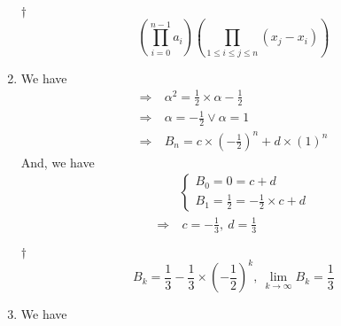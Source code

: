 \documentclass[a4paper,12pt]{article}
\begin{document}
\begin{enumerate}
    \begin{answer}{$\dag$}\begin{equation}
            (\displaystyle\prod_{i = 0}^{n - 1}a_i)(\displaystyle\prod_{1 \le i \le j \le n}(x_j - x_i))
        \end{equation} 
    \end{answer}
    \item We have \begin{equation}
        \begin{aligned}
            \Rightarrow & \ \alpha^2 = \frac{1}{2} \times \alpha - \frac{1}{2} \\
            \Rightarrow & \ \alpha = -\frac{1}{2} \lor \alpha = 1 \\
            \Rightarrow & \ B_n = c \times (-\frac{1}{2})^n + d \times (1)^n
        \end{aligned}
    \end{equation} And, we have \begin{equation}
        \begin{aligned}
            & \begin{cases}
                B_0 = 0 = c + d \\
                B_1 = \frac{1}{2} = -\frac{1}{2} \times c + d
            \end{cases} \\
            \Rightarrow & \ c = -\frac{1}{3}, \ d = \frac{1}{3}
        \end{aligned}
    \end{equation}
    \begin{answer}{$\dag$}\begin{equation}
            B_k = \frac{1}{3} - \frac{1}{3} \times (-\frac{1}{2})^k, \ \lim_{k \rightarrow \infty} B_k = \frac{1}{3}
        \end{equation} 
    \end{answer}
    \item We have \begin{enumerate}[label=(\alph*)]

\end{enumerate}
\end{enumerate}
\end{document}
